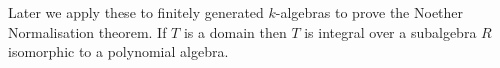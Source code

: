 Later we apply these to finitely generated $k$-algebras to prove the Noether
Normalisation theorem. If $T$ is a domain then $T$ is integral over a subalgebra
$R$ isomorphic to a polynomial algebra.
